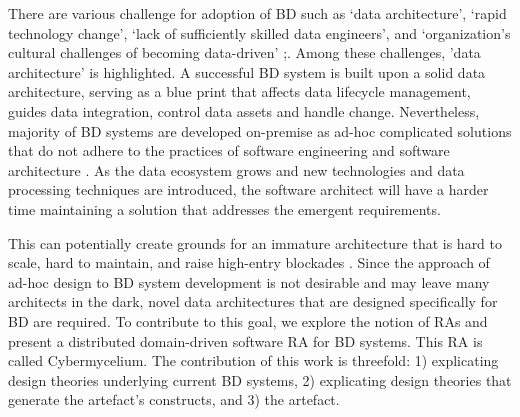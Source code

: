 \documentclass[review]{elsarticle}
\begin{document}
There are various challenge for adoption of BD such as `data architecture', `rapid technology change', `lack of sufficiently skilled data engineers', and `organization's cultural challenges of becoming data-driven' \cite{AtaeiBigDataEnvirons};\cite{Singh}. Among these challenges, 'data architecture' is highlighted. A successful BD system is built upon a solid data architecture, serving as a blue print that affects data lifecycle management, guides data integration, control data assets and handle change. Nevertheless, majority of BD systems are developed on-premise as ad-hoc complicated solutions that do not adhere to the practices of software engineering and software architecture \cite{Gorton,Nadal}. As the data ecosystem grows and new technologies and data processing techniques are introduced, the software architect will have a harder time maintaining a solution that addresses the emergent requirements.



This can potentially create grounds for an immature architecture that is hard to scale, hard to maintain, and raise high-entry blockades \cite{AtaeiApsec}. Since the approach of ad-hoc design to BD system development is not desirable and may leave many architects in the dark, novel data architectures that are designed specifically for BD are required. To contribute to this goal, we explore the notion of RAs and present a distributed domain-driven software RA for BD systems. This RA is called Cybermycelium. The contribution of this work is threefold: 1) explicating design theories underlying current BD systems, 2) explicating design theories that generate the artefact's constructs, and 3) the artefact. 
\end{document}
